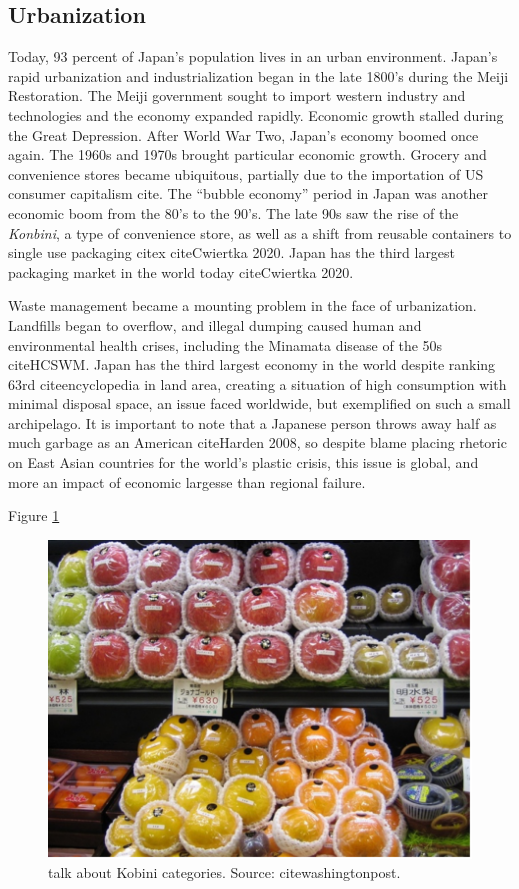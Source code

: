 \documentclass{book}\usepackage{knitr}
\begin{document}
\subsection{Urbanization}

	Today, 93 percent of Japan's population lives in an urban environment. Japan's rapid urbanization and industrialization began in the late 1800's during the Meiji Restoration. The Meiji government sought to import western industry and technologies and the economy expanded rapidly. Economic growth stalled during the Great Depression. After World War Two, Japan's economy boomed once again. The 1960s and 1970s brought particular economic growth. Grocery and convenience stores became ubiquitous, partially due to the importation of US consumer capitalism cite. The ``bubble economy'' period in Japan was another economic boom from the 80's to the 90's. The late 90s saw the rise of the \emph{Konbini}, a type of convenience store, as well as a shift from reusable containers to single use packaging citex citeCwiertka 2020. Japan has the third largest packaging market in the world today citeCwiertka 2020. 
	
Waste management became a mounting problem in the face of urbanization. Landfills began to overflow, and illegal dumping caused human and environmental health crises, including the Minamata disease of the 50s citeHCSWM. Japan has the third largest economy in the world despite ranking 63rd citeencyclopedia in land area, creating a situation of high consumption with minimal disposal space, an issue faced worldwide, but exemplified on such a small archipelago. It is important to note that a Japanese person throws away half as much garbage as an American citeHarden 2008, so despite blame placing rhetoric on East Asian countries for the world's plastic crisis, this issue is global, and more an impact of economic largesse than regional failure.  
	
Figure \ref{fig:konbini}

\begin{figure}
\includegraphics[width=\linewidth]{images/JapanPlastics/groceries.png}
\caption{talk about Kobini categories. Source: citewashingtonpost.}
\label{fig:konbini}
\end{figure}
\end{document}
